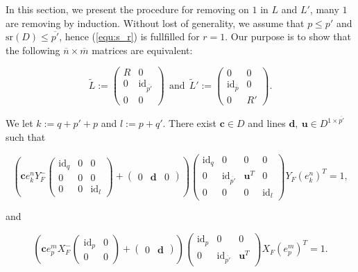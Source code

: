 \documentclass{ifacconf}
\newcommand\g[1]{\textbf{#1}}
\newcommand\id[1]{\text{id}_{#1}}
\newcommand\sr{\text{sr}(D)}
\begin{document}
In this section, we present the procedure for removing on $1$ in $L$ and
$L'$, many $1$ are removing by induction. Without lost of generality, we
assume that $p\leq p'$ and $\sr\leq \overline{p'}$, hence (\ref{equ:s_r})
is fullfilled for $r=1$. Our purpose is to show that the following
$\overline{n}\times\overline{m}$ matrices are equivalent:
\medskip
\begin{small}
  \[\tilde{L}:=\begin{pmatrix}
  R & 0\\
  0 & \id{\overline{p'}}\\
  0 & 0
  \end{pmatrix}\ \ \text{and}\ \
  \tilde{L}':=\begin{pmatrix}
  0 & 0\\
  \id{\overline{p}} & 0\\
  0 & R'
  \end{pmatrix}.\]
\end{small}

\begin{prop}\label{prop:reduced_Bezout_id_part}
  We let $k:=q+p'+p$ and $l:=p+q'$. There exist $\g{c}\in D$ and lines
  $\g{d},\ \g{u}\in D^{1\times\overline{p'}}$ such that
  \begin{small}
    \begin{equation}\label{equ:reduced_Bezout_id_rel_part}
      \left(\g{c}e^n_{k}Y_F^-\begin{pmatrix}
      \id{q} & 0 & 0\\
      0 & 0 & 0\\
      0 & 0 & \id{l}
      \end{pmatrix}+\begin{pmatrix}
      0 & \g{d} & 0
      \end{pmatrix}\right)\begin{pmatrix}
        \id{q} & 0 & 0 & 0\\
        0 & \id{\overline{p'}} & \g{u}^T & 0\\
        0 & 0 & 0 & \id{l}
      \end{pmatrix}Y_F(e^{n}_{k})^T=1,
    \end{equation}
  \end{small}
  and
  \begin{small}
    \begin{equation}\label{equ:reduced_Bezout_id_gen_part}
      \left(\g{c}e^m_pX_F^-\begin{pmatrix}
      \id{p} & 0\\
      0 & 0
      \end{pmatrix}+\begin{pmatrix}
      0 & \g{d}
      \end{pmatrix}\right)\begin{pmatrix}
        \id{p} & 0 & 0\\
        0 & \id{\overline{p'}} & \g{u}^T
      \end{pmatrix}X_F(e^{m}_{p})^T=1.
    \end{equation}
  \end{small}
\end{prop}
\end{document}
